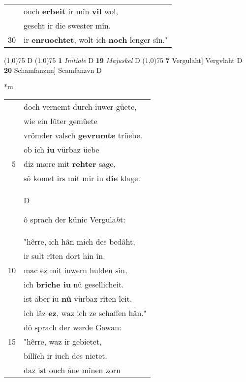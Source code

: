 \documentclass[8pt,a4paper,notitlepage]{article}
\begin{document}
\begin{table}[ht]
\begin{minipage}[t]{0.5\linewidth}
\begin{tabular}{rl}
 & ouch \textbf{erbeit} ir mîn \textbf{vil} wol,\\ 
 & geseht ir die swester mîn.\\ 
30 & ir \textbf{enruochtet}, wolt ich \textbf{noch} lenger sîn."\\ 
\end{tabular}
\scriptsize
\line(1,0){75} \newline
D \newline
\line(1,0){75} \newline
\textbf{1} \textit{Initiale} D  \textbf{19} \textit{Majuskel} D  \newline
\line(1,0){75} \newline
\textbf{7} Vergulaht] Vergvlaht D \textbf{20} Schamfanzun] Scamfanzvn D \newline
\end{minipage}
\hspace{0.5cm}
\begin{minipage}[t]{0.5\linewidth}
\small
\begin{center}*m
\end{center}
\begin{tabular}{rl}
 & doch vernemt durch iuwer güete,\\ 
 & wie ein lûter gemüete\\ 
 & vrömder valsch \textbf{gevrumte} trüebe.\\ 
 & ob ich \textbf{iu} vürbaz üebe\\ 
5 & diz mære mit \textbf{rehter} sage,\\ 
 & sô komet irs mit mir in \textbf{die} klage.\\ 
 & \begin{large}D\end{large}ô sprach der künic Vergula\textit{h}t:\\ 
 & "hêrre, ich hân mich des bedâht,\\ 
 & ir sult rîten dort hin în.\\ 
10 & mac ez mit iuwern hulden sîn,\\ 
 & ich \textbf{briche iu} nû gesellicheit.\\ 
 & ist aber iu \textbf{nû} vürbaz rîten leit,\\ 
 & ich lâz \textbf{ez}, waz ich ze schaffen hân."\\ 
 & dô sprach der werde Gawan:\\ 
15 & "hêrre, waz ir gebietet,\\ 
 & billîch ir iuch des nietet.\\ 
 & daz ist ouch âne mînen zorn\\ 

\end{tabular}
\end{minipage}
\end{table}
\end{document}
